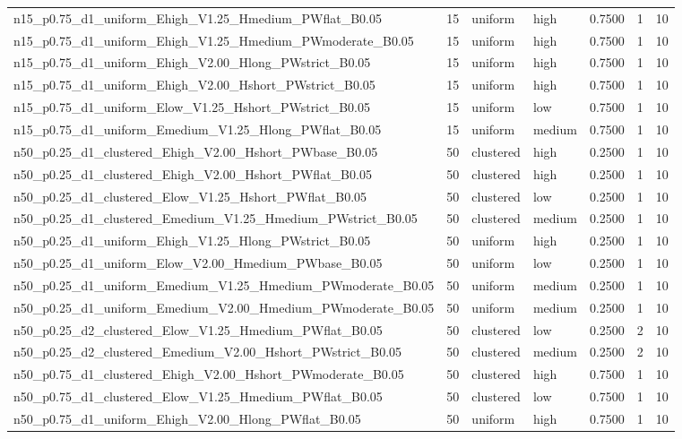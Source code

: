 \begin{tabular}{lrllrrr}
n15_p0.75_d1_uniform_Ehigh_V1.25_Hmedium_PWflat_B0.05 & 15 & uniform & high & 0.7500 & 1 & 10 \\
n15_p0.75_d1_uniform_Ehigh_V1.25_Hmedium_PWmoderate_B0.05 & 15 & uniform & high & 0.7500 & 1 & 10 \\
n15_p0.75_d1_uniform_Ehigh_V2.00_Hlong_PWstrict_B0.05 & 15 & uniform & high & 0.7500 & 1 & 10 \\
n15_p0.75_d1_uniform_Ehigh_V2.00_Hshort_PWstrict_B0.05 & 15 & uniform & high & 0.7500 & 1 & 10 \\
n15_p0.75_d1_uniform_Elow_V1.25_Hshort_PWstrict_B0.05 & 15 & uniform & low & 0.7500 & 1 & 10 \\
n15_p0.75_d1_uniform_Emedium_V1.25_Hlong_PWflat_B0.05 & 15 & uniform & medium & 0.7500 & 1 & 10 \\
n50_p0.25_d1_clustered_Ehigh_V2.00_Hshort_PWbase_B0.05 & 50 & clustered & high & 0.2500 & 1 & 10 \\
n50_p0.25_d1_clustered_Ehigh_V2.00_Hshort_PWflat_B0.05 & 50 & clustered & high & 0.2500 & 1 & 10 \\
n50_p0.25_d1_clustered_Elow_V1.25_Hshort_PWflat_B0.05 & 50 & clustered & low & 0.2500 & 1 & 10 \\
n50_p0.25_d1_clustered_Emedium_V1.25_Hmedium_PWstrict_B0.05 & 50 & clustered & medium & 0.2500 & 1 & 10 \\
n50_p0.25_d1_uniform_Ehigh_V1.25_Hlong_PWstrict_B0.05 & 50 & uniform & high & 0.2500 & 1 & 10 \\
n50_p0.25_d1_uniform_Elow_V2.00_Hmedium_PWbase_B0.05 & 50 & uniform & low & 0.2500 & 1 & 10 \\
n50_p0.25_d1_uniform_Emedium_V1.25_Hmedium_PWmoderate_B0.05 & 50 & uniform & medium & 0.2500 & 1 & 10 \\
n50_p0.25_d1_uniform_Emedium_V2.00_Hmedium_PWmoderate_B0.05 & 50 & uniform & medium & 0.2500 & 1 & 10 \\
n50_p0.25_d2_clustered_Elow_V1.25_Hmedium_PWflat_B0.05 & 50 & clustered & low & 0.2500 & 2 & 10 \\
n50_p0.25_d2_clustered_Emedium_V2.00_Hshort_PWstrict_B0.05 & 50 & clustered & medium & 0.2500 & 2 & 10 \\
n50_p0.75_d1_clustered_Ehigh_V2.00_Hshort_PWmoderate_B0.05 & 50 & clustered & high & 0.7500 & 1 & 10 \\
n50_p0.75_d1_clustered_Elow_V1.25_Hmedium_PWflat_B0.05 & 50 & clustered & low & 0.7500 & 1 & 10 \\
n50_p0.75_d1_uniform_Ehigh_V2.00_Hlong_PWflat_B0.05 & 50 & uniform & high & 0.7500 & 1 & 10 \\

\end{tabular}
